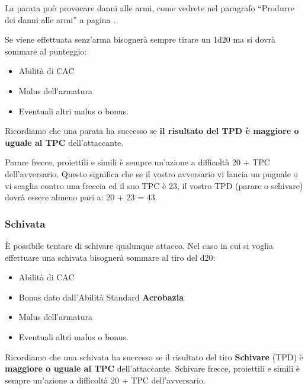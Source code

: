La parata pu\`o provocare danni alle armi, come vedrete nel paragrafo
``Produrre dei danni alle armi'' a pagina \pageref{danniarmi}.


Se viene effettuata senz'arma bisogner\`a sempre tirare un 1d20 ma si
dovr\`a sommare al punteggio: 

\begin{itemize}
\itemsep -6pt
\item Abilit\`a di CAC
\item Malus dell'armatura
\item Eventuali altri malus o bonus.  
\end{itemize}

Ricordiamo che una parata ha successo se \textbf{il risultato del TPD \`e
maggiore o uguale al TPC} dell'attaccante.

Parare frecce, proiettili e simili \`e sempre
un'azione a difficolt\`a 20 + TPC dell'avversario.  Questo
significa che se il vostro avversario vi lancia un pugnale o vi
scaglia contro una freccia ed il suo TPC \`e 23, il vostro TPD
(parare o schivare) dovr\`a essere almeno pari a: 20 + 23 = 43.

\subsubsection{Schivata} \`E possibile tentare di schivare qualunque attacco.
Nel caso in cui si voglia effettuare una schivata bisogner\`a
sommare al tiro del d20: 

\begin{itemize}
\itemsep -6pt
\item Abilit\`a di CAC
\item Bonus dato dall'Abilit\`a Standard \textbf{Acrobazia}
\item Malus dell'armatura
\item Eventuali altri malus o bonus.
\end{itemize}

Ricordiamo che una schivata ha successo se il risultato del tiro
\textbf{Schivare} (TPD) \`e \textbf{maggiore o uguale al TPC}
dell'attaccante.  Schivare frecce, proiettili e simili \`e sempre
un'azione a difficolt\`a 20 + TPC dell'avversario.

